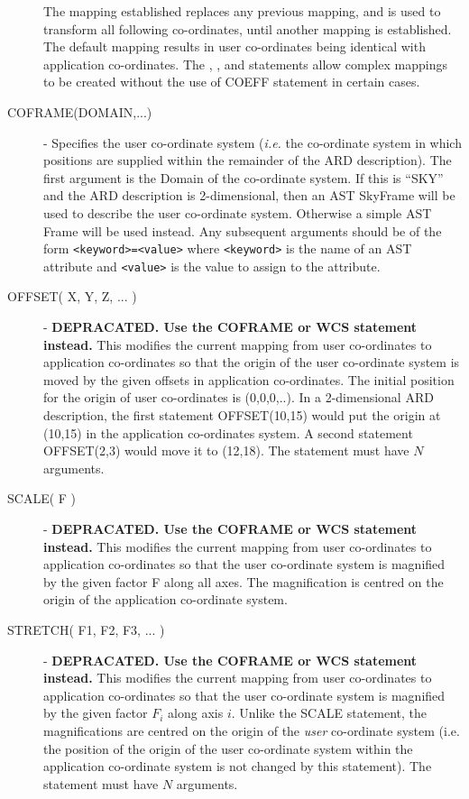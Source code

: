 \begin{description}
The mapping established replaces any previous mapping, and is used to transform
all following co-ordinates, until another mapping is established. The default
mapping results in user co-ordinates being identical with application
co-ordinates. The , ,  and  statements allow complex
mappings to be created without the use of COEFF statement in certain cases. 

\item [\label{ST:COFRAME}COFRAME(DOMAIN,...)] - Specifies the user
co-ordinate system ({\em i.e.} the co-ordinate system in which positions
are supplied within the remainder of the ARD description). The first
argument is the Domain of the co-ordinate system. If this is ``SKY'' and
the ARD description is 2-dimensional, then an AST SkyFrame will be used
to describe the user co-ordinate system. Otherwise a simple AST Frame
will be used instead. Any subsequent arguments should be of the form 
{\tt <keyword>=<value>} where {\tt <keyword>} is the name of an AST
attribute and {\tt <value>} is the value to assign to the attribute.

\item [\label{ST:OFF}OFFSET( X, Y, Z, ... )] - {\bf DEPRACATED. Use the COFRAME or WCS statement instead.} This modifies the current mapping
from user co-ordinates to application co-ordinates so that the origin of the
user co-ordinate system is moved by the given offsets in application
co-ordinates. The initial position for the origin of user co-ordinates is
(0,0,0,..). In a 2-dimensional ARD description, the first statement OFFSET(10,15)
would put the origin at (10,15) in the application co-ordinates system. A second
statement OFFSET(2,3) would move it to (12,18). The statement must have $N$ 
arguments.

\item [\label{ST:SCA}SCALE( F )] - {\bf DEPRACATED. Use the COFRAME or WCS statement instead.} This modifies the current mapping from user co-ordinates to
application co-ordinates so that the user co-ordinate system is magnified by the
given factor F along all axes. The magnification is centred on the origin of the
application co-ordinate system. 

\item [\label{ST:STR}STRETCH( F1, F2, F3, ... )] - {\bf DEPRACATED. Use the COFRAME or WCS statement instead.} This modifies the current mapping from user
co-ordinates to application co-ordinates so that the user co-ordinate system is
magnified by the given factor $F_{i}$ along axis $i$. Unlike the SCALE
statement, the magnifications are centred on the origin of the {\em user}
co-ordinate system (i.e. the position of the origin of the user co-ordinate
system within the application co-ordinate system is not changed by this
statement). The statement must have $N$ arguments. 


\end{description}

